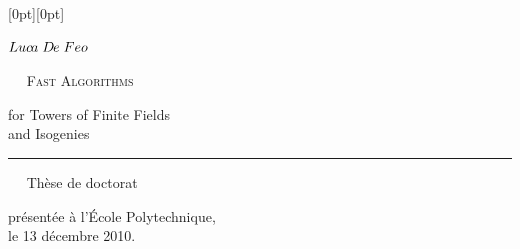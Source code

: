 \begin{titlingpage}
  \setlength{\parindent}{0pt}

  \raisebox{0pt}[0pt][0pt]{\makebox[\textwidth][r]{\rule[-\textheight]{0.5pt}{\textheight}}}
  \parbox{0.9\textwidth}{
    \begin{flushright}
      \vspace{\onelineskip}
      \huge
      $Luc\kern-0.2ex a\;D\kern-0.2ex e\;Feo$
      \par\smallskip
      \scshape
      \Huge
      \ifartwork
      ~~
      \fi
      \textcolor{titlecolor}{Fast Algorithms}
      \par\bigskip\huge
      for Towers of Finite Fields\\
      and Isogenies
    \end{flushright}}
  \par\smallskip
  \rule{1.1\textwidth}{0.5pt}
  
  \vfill
  \parbox{0.9\textwidth}{
    \begin{flushright}
      \huge
      \ifartwork
      ~~
      \fi
      Thèse de doctorat
      \par\bigskip\Large
      présentée à l'École Polytechnique,\\
      le 13 décembre 2010.
    \end{flushright}}
  \vfill
\end{titlingpage}

